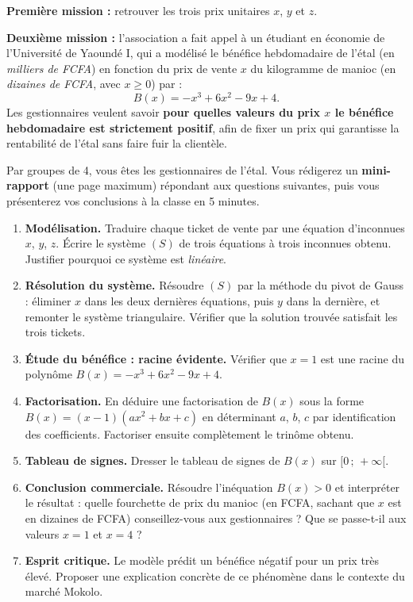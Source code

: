 \documentclass[11pt]{article}
\newcommand{\cle}[1]{{\popxbold\color{popdark}#1}}
\newcounter{popsec}
\newcounter{popsub}
\newcommand{\courssub}[1]{%
  \stepcounter{popsub}%
  \par\vspace{9pt}\noindent{\popxbold\fontsize{11.5}{13}\selectfont\color{popink}{\color{poporange}\thepopsec.\thepopsub}\hspace{6pt}#1}\par\nopagebreak\vspace{4pt}
}
\begin{document}
\textbf{Première mission :} retrouver les trois prix unitaires $x$, $y$ et $z$.

\textbf{Deuxième mission :} l'association a fait appel à un étudiant en économie de l'Université de Yaoundé I, qui a modélisé le bénéfice hebdomadaire de l'étal (en \emph{milliers de FCFA}) en fonction du prix de vente $x$ du kilogramme de manioc (en \emph{dizaines de FCFA}, avec $x \geq 0$) par :
\[ B(x) = -x^3 + 6x^2 - 9x + 4. \]
Les gestionnaires veulent savoir \textbf{pour quelles valeurs du prix $x$ le bénéfice hebdomadaire est strictement positif}, afin de fixer un prix qui garantisse la rentabilité de l'étal sans faire fuir la clientèle.

\courssub{Consignes}

Par groupes de 4, vous êtes les gestionnaires de l'étal. Vous rédigerez un \textbf{mini-rapport} (une page maximum) répondant aux questions suivantes, puis vous présenterez vos conclusions à la classe en 5 minutes.

\begin{enumerate}
\item \textbf{Modélisation.} Traduire chaque ticket de vente par une équation d'inconnues $x$, $y$, $z$. Écrire le système $(S)$ de trois équations à trois inconnues obtenu. Justifier pourquoi ce système est \emph{linéaire}.
\item \textbf{Résolution du système.} Résoudre $(S)$ par la méthode du \cle{pivot de Gauss} : éliminer $x$ dans les deux dernières équations, puis $y$ dans la dernière, et remonter le système triangulaire. Vérifier que la solution trouvée satisfait les trois tickets.
\item \textbf{Étude du bénéfice : racine évidente.} Vérifier que $x = 1$ est une racine du polynôme $B(x) = -x^3 + 6x^2 - 9x + 4$.
\item \textbf{Factorisation.} En déduire une factorisation de $B(x)$ sous la forme $B(x) = (x - 1)(ax^2 + bx + c)$ en déterminant $a$, $b$, $c$ par \cle{identification des coefficients}. Factoriser ensuite complètement le trinôme obtenu.
\item \textbf{Tableau de signes.} Dresser le tableau de signes de $B(x)$ sur $[0\,;\,+\infty[$.
\item \textbf{Conclusion commerciale.} Résoudre l'inéquation $B(x) > 0$ et interpréter le résultat : quelle fourchette de prix du manioc (en FCFA, sachant que $x$ est en dizaines de FCFA) conseillez-vous aux gestionnaires ? Que se passe-t-il aux valeurs $x = 1$ et $x = 4$ ?
\item \textbf{Esprit critique.} Le modèle prédit un bénéfice négatif pour un prix très élevé. Proposer une explication concrète de ce phénomène dans le contexte du marché Mokolo.
\end{enumerate}
\end{document}
